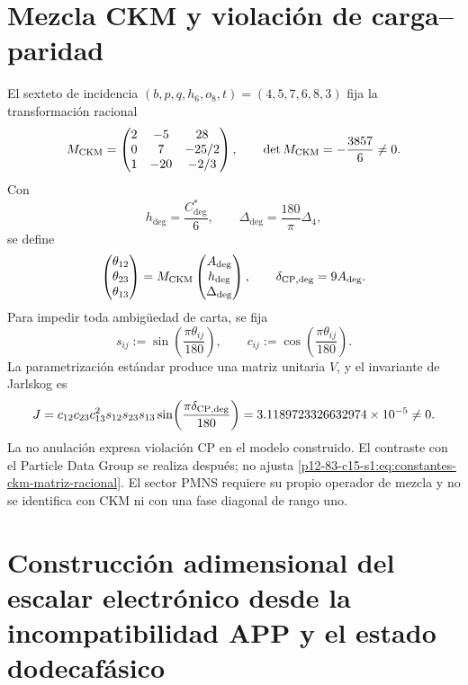 \label{chap:83-15}

\section*{Mezcla CKM y violación de carga--paridad}

El sexteto de incidencia
\((b,p,q,h_6,o_8,t)=(4,5,7,6,8,3)\) fija la transformación racional
\begin{equation}\label{p12-83-c15-s1:eq:constantes-ckm-matriz-racional}
 M_{\rm CKM}=
 \begin{pmatrix}
 2&-5&28\\
 0&7&-25/2\\
 1&-20&-2/3
 \end{pmatrix},
 \qquad
 \det M_{\rm CKM}=-\frac{3857}{6}\ne0.
\end{equation}
Con
\[
 h_{\deg}=\frac{C^*_{\deg}}6,\qquad
 \Delta_{\deg}=\frac{180}{\pi}\Delta_4,
\]
se define
\[
 \begin{pmatrix}\theta_{12}\\\theta_{23}\\\theta_{13}\end{pmatrix}
 =M_{\rm CKM}
 \begin{pmatrix}A_{\deg}\\h_{\deg}\\\Delta_{\deg}\end{pmatrix},
 \qquad \delta_{{\rm CP},\deg}=9A_{\deg}.
\]
Para impedir toda ambigüedad de carta, se fija
\[
 s_{ij}:=\sin\!\left(\frac{\pi\theta_{ij}}{180}\right),\qquad
 c_{ij}:=\cos\!\left(\frac{\pi\theta_{ij}}{180}\right).
\]
La parametrización estándar produce una matriz unitaria \(V\), y el
invariante de Jarlskog es
\begin{equation}\label{p12-83-c15-s1:eq:constantes-jarlskog}
 J=c_{12}c_{23}c_{13}^2s_{12}s_{23}s_{13}
 \sin\!\left(\frac{\pi\delta_{{\rm CP},\deg}}{180}\right)
 =3.1189723326632974\times10^{-5}\ne0.
\end{equation}
La no anulación expresa violación CP en el modelo construido. El contraste
con el Particle Data Group se realiza después; no ajusta
\eqref{p12-83-c15-s1:eq:constantes-ckm-matriz-racional}. El sector PMNS requiere su propio
operador de mezcla y no se identifica con CKM ni con una fase diagonal de
rango uno.


\section{Construcción adimensional del escalar electrónico desde la incompatibilidad APP y el estado dodecafásico}
\label{p12-83-c15-s2:chap:biografia-electron-rev6}

